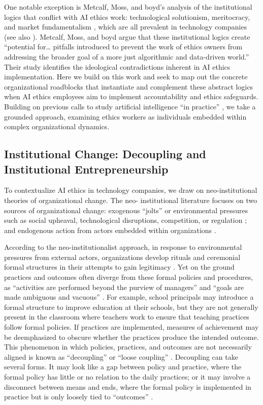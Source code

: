 \documentclass[sigconf]{acmart}
\begin{document}
One notable exception is Metcalf, Moss, and boyd’s analysis of the institutional logics that conflict with AI ethics work: technological solutionism, meritocracy, and market fundamentalism \cite{metcalf_owning_2019}, which are all prevalent in technology companies (see also \cite{avnoon_contextualizing_2023}). Metcalf, Moss, and boyd argue that these institutional logics create “potential for… pitfalls introduced to prevent the work of ethics owners from addressing the broader goal of a more just algorithmic and data-driven world.” Their study identifies the ideological contradictions inherent in AI ethics implementation. Here we build on this work and seek to map out the concrete organizational roadblocks that instantiate and complement these abstract logics when AI ethics employees aim to implement accountability and ethics safeguards. Building on previous calls to study artificial intelligence “in practice” \cite{christin_algorithms_2017}, we take a grounded approach, examining ethics workers as individuals embedded within complex organizational dynamics.


\subsection{Institutional Change: Decoupling and Institutional Entrepreneurship}

To contextualize AI ethics in technology companies, we draw on
neo-institutional theories of organizational change. The neo-
institutional literature focuses on two sources of organizational change: exogenous “jolts” or environmental pressures such as social upheaval, technological disruptions, competition, or regulation \cite{meyer_adapting_1982, greenwood_institutional_2006}; and endogenous action from actors embedded within organizations \cite{dimaggio_interest_1988}. 

According to the neo-institutionalist approach, in response to environmental pressures from external actors, organizations develop rituals and ceremonial formal structures in their attempts to gain legitimacy \cite{dimaggio_iron_1983}. Yet on the ground practices and outcomes often diverge from these formal policies and procedures, as “activities are performed beyond the purview of managers” and “goals are made ambiguous and vacuous” \cite{meyer_institutionalized_1977}. For example, school principals may introduce a formal structure to improve education at their schools, but they are not generally present in the classroom where teachers work to ensure that teaching practices follow formal policies. If practices are implemented, measures of achievement may be deemphasized to obscure whether the practices produce the intended outcome. This phenomenon in which policies, practices, and outcomes are not necessarily aligned is known as “decoupling” or “loose coupling” \cite{meyer_institutionalized_1977}. Decoupling can take several forms. It may look like a gap between policy and practice, where the formal policy has little or no relation to the daily practices; or it may involve a disconnect between means and ends, where the formal policy is implemented in practice but is only loosely tied to “outcomes” \cite{bromley_smoke_2012}. 
\end{document}
